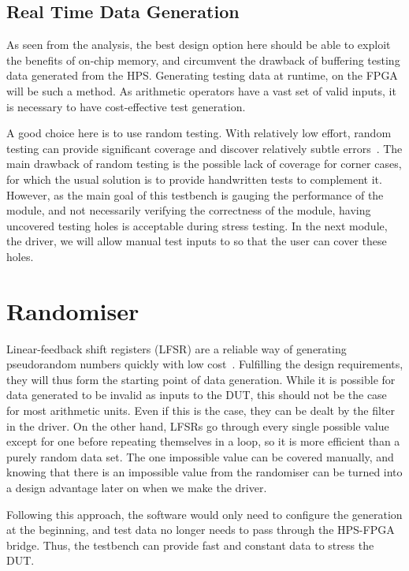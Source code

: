 \subsection{Real Time Data Generation}
As seen from the analysis, the best design option here should be able to exploit the benefits of on-chip memory, and circumvent the drawback of buffering testing data generated from the HPS.
Generating testing data at runtime, on the FPGA will be such a method.
As arithmetic operators have a vast set of valid inputs, it is necessary to have cost-effective test generation.

A good choice here is to use random testing.
With relatively low effort, random testing can provide significant coverage and discover relatively subtle errors~\cite{Duran1}.
The main drawback of random testing is the possible lack of coverage for corner cases, for which the usual solution is to provide handwritten tests to complement it.
However, as the main goal of this testbench is gauging the performance of the module, and not necessarily verifying the correctness of the module, having uncovered testing holes is acceptable during stress testing.
In the next module, the driver, we will allow manual test inputs to so that the user can cover these holes.

\section{Randomiser}

Linear-feedback shift registers (LFSR) are a reliable way of generating pseudorandom numbers quickly with low cost~\cite{Hazwani1}.
Fulfilling the design requirements, they will thus form the starting point of data generation.
While it is possible for data generated to be invalid as inputs to the DUT, this should not be the case for most arithmetic units.
Even if this is the case, they can be dealt by the filter in the driver.
On the other hand, LFSRs go through every single possible value except for one before repeating themselves in a loop, so it is more efficient than a purely random data set.
The one impossible value can be covered manually, and knowing that there is an impossible value from the randomiser can be turned into a design advantage later on when we make the driver.

Following this approach, the software would only need to configure the generation at the beginning, and test data no longer needs to pass through the HPS-FPGA bridge.
Thus, the testbench can provide fast and constant data to stress the DUT.

